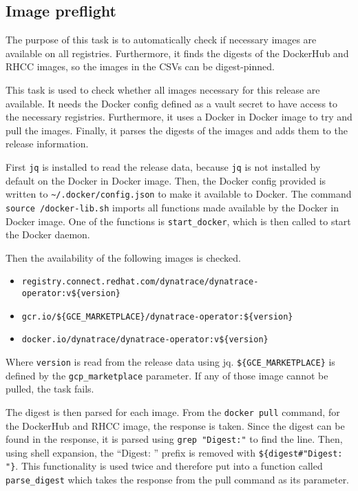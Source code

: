 \subsection{Image preflight}\label{subsec:image-preflight}

The purpose of this task is to automatically check if necessary images are available on all registries.
Furthermore, it finds the digests of the DockerHub and RHCC images, so the images in the CSVs can be digest-pinned.

This task is used to check whether all images necessary for this release are available.
It needs the Docker config defined as a vault secret to have access to the necessary registries.
Furthermore, it uses a Docker in Docker image to try and pull the images.
Finally, it parses the digests of the images and adds them to the release information.

First \verb|jq| is installed to read the release data, because \verb|jq| is not installed by default on the Docker in Docker image.
Then, the Docker config provided is written to \verb|~/.docker/config.json| to make it available to Docker.
The command \verb|source /docker-lib.sh| imports all functions made available by the Docker in Docker image.
One of the functions is \verb|start_docker|, which is then called to start the Docker daemon.

Then the availability of the following images is checked.
\begin{itemize}
    \item \verb|registry.connect.redhat.com/dynatrace/dynatrace-operator:v${version}|
    \item \verb|gcr.io/${GCE_MARKETPLACE}/dynatrace-operator:${version}|
    \item \verb|docker.io/dynatrace/dynatrace-operator:v${version}|
\end{itemize}

Where \verb|version| is read from the release data using jq.
\verb|${GCE_MARKETPLACE}| is defined by the \verb|gcp_marketplace| parameter.
If any of those image cannot be pulled, the task fails.

The digest is then parsed for each image.
From the \verb|docker pull| command, for the DockerHub and RHCC image, the response is taken.
Since the digest can be found in the response, it is parsed using \verb|grep "Digest:"| to find the line.
Then, using shell expansion, the ``Digest: '' prefix is removed with \verb|${digest#"Digest: "}|.
This functionality is used twice and therefore put into a function called \verb|parse_digest| which takes the response from the pull command as its parameter.
